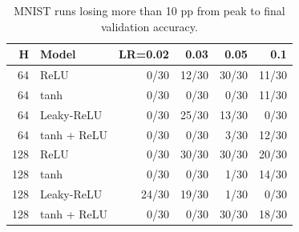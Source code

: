 \begin{table}[htbp]
\centering
\caption{MNIST runs losing more than 10 pp from peak to final validation accuracy.}
\label{tab:dropthreshold}
\small
\begin{tabular}{@{}rlrrrr@{}}
\toprule
H & Model & LR=0.02 & 0.03 & 0.05 & 0.1 \\
\midrule
64 & ReLU & 0/30 & 12/30 & 30/30 & 11/30 \\
64 & tanh & 0/30 & 0/30 & 0/30 & 11/30 \\
64 & Leaky-ReLU & 0/30 & 25/30 & 13/30 & 0/30 \\
64 & tanh + ReLU & 0/30 & 0/30 & 3/30 & 12/30 \\
128 & ReLU & 0/30 & 30/30 & 30/30 & 20/30 \\
128 & tanh & 0/30 & 0/30 & 1/30 & 14/30 \\
128 & Leaky-ReLU & 24/30 & 19/30 & 1/30 & 0/30 \\
128 & tanh + ReLU & 0/30 & 0/30 & 30/30 & 18/30 \\
\bottomrule
\end{tabular}
\par{}
\end{table}
